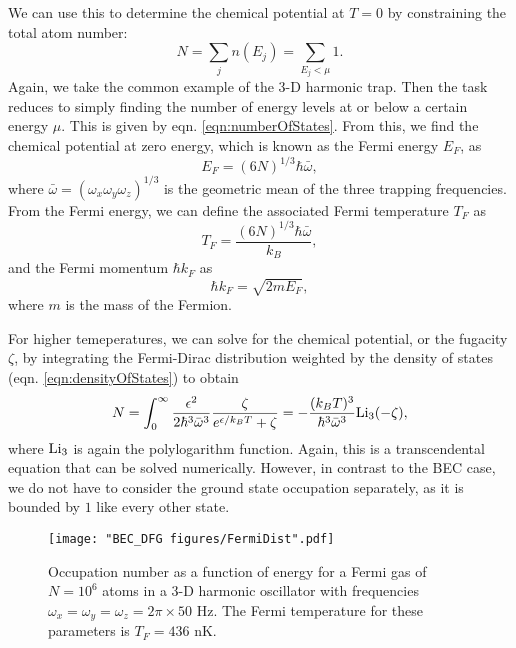 We can use this to determine the chemical potential at $T=0$ by constraining the total atom number:
\begin{equation}
N=\sum_j n(E_j) = \sum_{E_j<\mu} 1.
\end{equation}
Again, we take the common example of the 3-D harmonic trap. Then the task reduces to simply finding the number of energy levels at or below a certain energy $\mu$. This is given by eqn. \ref{eqn:numberOfStates}. From this, we find the chemical potential at zero energy, which is known as the Fermi energy $E_F$, as
\begin{equation}
E_F = (6 N)^{1/3}\hbar\bar{\omega},
\end{equation}
where $\bar{\omega}=(\omega_x\omega_y\omega_z)^{1/3}$ is the geometric mean of the three trapping frequencies. From the Fermi energy, we can define the associated Fermi temperature $T_F$ as
\begin{equation}
T_F = \frac{(6 N)^{1/3}\hbar\bar{\omega}}{k_B},
\end{equation}
and the Fermi momentum $\hbar k_F$ as
\begin{equation}
\hbar k_F = \sqrt{2 m E_F},
\end{equation}
where $m$ is the mass of the Fermion. 

For higher temeperatures, we can solve for the chemical potential, or the fugacity $\zeta$, by integrating the Fermi-Dirac distribution weighted by the density of states (eqn. \ref{eqn:densityOfStates}) to obtain
\begin{equation}
N = \int_0^{\infty} \frac{\epsilon^2}{2\hbar^3 \bar{\omega}^3}\frac{\zeta}{e^{\epsilon/k_B T}+\zeta} = -\frac{(k_BT)^3}{\hbar^3 \bar{\omega}^3}{\rm Li}_3(-\zeta),
\end{equation}
where ${\rm Li}_3$ is again the polylogarithm function. Again, this is a transcendental equation that can be solved numerically. However, in contrast to the BEC case, we do not have to consider the ground state occupation separately, as it is bounded by $1$ like every other state. 

\begin{figure}
	\texttt{[image: "BEC\_DFG figures/FermiDist".pdf]}
\caption[Occupation number as a function of energy for a Fermi gas]{Occupation number as a function of energy for a Fermi gas of $N=10^6$ atoms in a 3-D harmonic oscillator with frequencies $\omega_x=\omega_y=\omega_z=2\pi \times50$ Hz. The Fermi temperature for these parameters is $T_F=436$ nK.}
\label{fig:FermiDist}
\end{figure}

